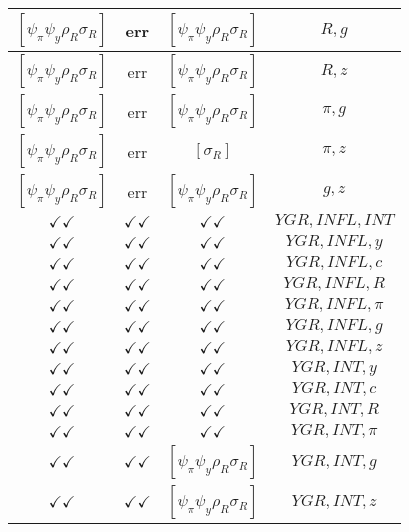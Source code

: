 \documentclass[a4paper,10pt]{article}
\begin{document}
\begin{longtable}{|c|c|c|c|}
\hline
$[\psi_\pi \psi_y \rho_R \sigma_R ]$ & err & $[\psi_\pi \psi_y \rho_R \sigma_R ]$ & ${R},{g}$ \\
\hline
$[\psi_\pi \psi_y \rho_R \sigma_R ]$ & err & $[\psi_\pi \psi_y \rho_R \sigma_R ]$ & ${R},{z}$ \\
\hline
$[\psi_\pi \psi_y \rho_R \sigma_R ]$ & err & $[\psi_\pi \psi_y \rho_R \sigma_R ]$ & ${\pi},{g}$ \\
\hline
$[\psi_\pi \psi_y \rho_R \sigma_R ]$ & err & $[\sigma_R ]$ & ${\pi},{z}$ \\
\hline
$[\psi_\pi \psi_y \rho_R \sigma_R ]$ & err & $[\psi_\pi \psi_y \rho_R \sigma_R ]$ & ${g},{z}$ \\
\hline
$\checkmark\checkmark$ & $\checkmark\checkmark$ & $\checkmark\checkmark$ & ${YGR},{INFL},{INT}$ \\
\hline
$\checkmark\checkmark$ & $\checkmark\checkmark$ & $\checkmark\checkmark$ & ${YGR},{INFL},{y}$ \\
\hline
$\checkmark\checkmark$ & $\checkmark\checkmark$ & $\checkmark\checkmark$ & ${YGR},{INFL},{c}$ \\
\hline
$\checkmark\checkmark$ & $\checkmark\checkmark$ & $\checkmark\checkmark$ & ${YGR},{INFL},{R}$ \\
\hline
$\checkmark\checkmark$ & $\checkmark\checkmark$ & $\checkmark\checkmark$ & ${YGR},{INFL},{\pi}$ \\
\hline
$\checkmark\checkmark$ & $\checkmark\checkmark$ & $\checkmark\checkmark$ & ${YGR},{INFL},{g}$ \\
\hline
$\checkmark\checkmark$ & $\checkmark\checkmark$ & $\checkmark\checkmark$ & ${YGR},{INFL},{z}$ \\
\hline
$\checkmark\checkmark$ & $\checkmark\checkmark$ & $\checkmark\checkmark$ & ${YGR},{INT},{y}$ \\
\hline
$\checkmark\checkmark$ & $\checkmark\checkmark$ & $\checkmark\checkmark$ & ${YGR},{INT},{c}$ \\
\hline
$\checkmark\checkmark$ & $\checkmark\checkmark$ & $\checkmark\checkmark$ & ${YGR},{INT},{R}$ \\
\hline
$\checkmark\checkmark$ & $\checkmark\checkmark$ & $\checkmark\checkmark$ & ${YGR},{INT},{\pi}$ \\
\hline
$\checkmark\checkmark$ & $\checkmark\checkmark$ & $[\psi_\pi \psi_y \rho_R \sigma_R ]$ & ${YGR},{INT},{g}$ \\
\hline
$\checkmark\checkmark$ & $\checkmark\checkmark$ & $[\psi_\pi \psi_y \rho_R \sigma_R ]$ & ${YGR},{INT},{z}$ \\

\end{longtable}
\end{document}
